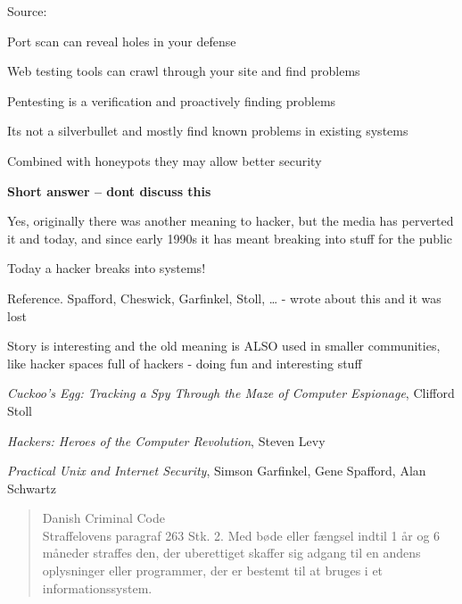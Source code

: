 \documentclass[Screen16to9,17pt]{foils}
\begin{document}
\vskip 1cm
Source:



\begin{list1}
\item Port scan can reveal holes in your defense
\item Web testing tools can crawl through your site and find problems
\item Pentesting is a verification and proactively finding problems
\item Its not a silverbullet and mostly find known problems in existing systems
\item Combined with honeypots they may allow better security
\end{list1}



{\bfseries Short answer -- dont discuss this}

Yes, originally there was another meaning to hacker, but the media has perverted it and today, and since early 1990s it has meant breaking into stuff for the public

{\color{red}\hlkbig Today a hacker breaks into systems!}

Reference. Spafford, Cheswick, Garfinkel, Stoll, \ldots
- wrote about this and it was lost

Story is interesting and the old meaning is ALSO used in smaller communities, like hacker spaces full of hackers - doing fun and interesting stuff
\begin{list2}
\item \emph{Cuckoo's Egg: Tracking a Spy Through the Maze of Computer
 Espionage},  Clifford Stoll
\item \emph{Hackers: Heroes of the Computer Revolution},
Steven Levy
\item \emph{Practical Unix and Internet Security},
Simson Garfinkel, Gene Spafford, Alan Schwartz
\end{list2}


\begin{quote}\small
Danish Criminal Code\\
Straffelovens paragraf 263 Stk. 2. Med bøde eller fængsel indtil 1 år og 6 måneder straffes den, der uberettiget skaffer sig adgang til en andens oplysninger eller programmer, der er bestemt til at bruges i et informationssystem.
\end{quote}
\end{document}
